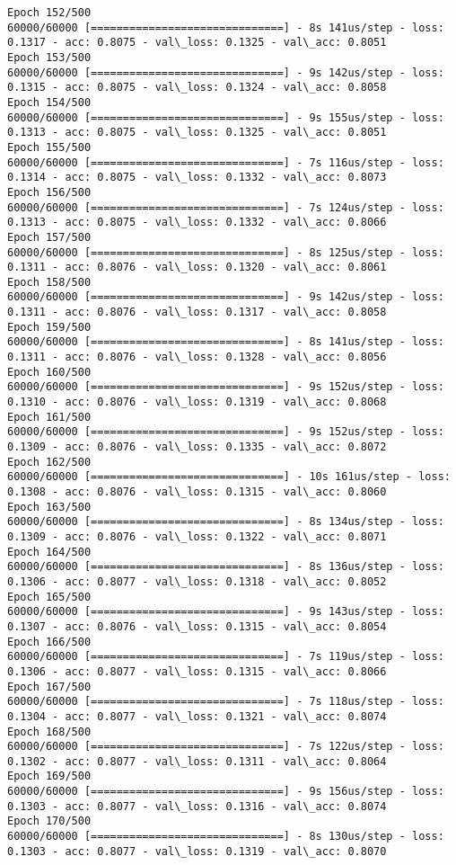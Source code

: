 \documentclass[11pt]{article}
\begin{document}
\begin{Verbatim}[commandchars=\\\{\}]
Epoch 152/500
60000/60000 [==============================] - 8s 141us/step - loss: 0.1317 - acc: 0.8075 - val\_loss: 0.1325 - val\_acc: 0.8051
Epoch 153/500
60000/60000 [==============================] - 9s 142us/step - loss: 0.1315 - acc: 0.8075 - val\_loss: 0.1324 - val\_acc: 0.8058
Epoch 154/500
60000/60000 [==============================] - 9s 155us/step - loss: 0.1313 - acc: 0.8075 - val\_loss: 0.1325 - val\_acc: 0.8051
Epoch 155/500
60000/60000 [==============================] - 7s 116us/step - loss: 0.1314 - acc: 0.8075 - val\_loss: 0.1332 - val\_acc: 0.8073
Epoch 156/500
60000/60000 [==============================] - 7s 124us/step - loss: 0.1313 - acc: 0.8075 - val\_loss: 0.1332 - val\_acc: 0.8066
Epoch 157/500
60000/60000 [==============================] - 8s 125us/step - loss: 0.1311 - acc: 0.8076 - val\_loss: 0.1320 - val\_acc: 0.8061
Epoch 158/500
60000/60000 [==============================] - 9s 142us/step - loss: 0.1311 - acc: 0.8076 - val\_loss: 0.1317 - val\_acc: 0.8058
Epoch 159/500
60000/60000 [==============================] - 8s 141us/step - loss: 0.1311 - acc: 0.8076 - val\_loss: 0.1328 - val\_acc: 0.8056
Epoch 160/500
60000/60000 [==============================] - 9s 152us/step - loss: 0.1310 - acc: 0.8076 - val\_loss: 0.1319 - val\_acc: 0.8068
Epoch 161/500
60000/60000 [==============================] - 9s 152us/step - loss: 0.1309 - acc: 0.8076 - val\_loss: 0.1335 - val\_acc: 0.8072
Epoch 162/500
60000/60000 [==============================] - 10s 161us/step - loss: 0.1308 - acc: 0.8076 - val\_loss: 0.1315 - val\_acc: 0.8060
Epoch 163/500
60000/60000 [==============================] - 8s 134us/step - loss: 0.1309 - acc: 0.8076 - val\_loss: 0.1322 - val\_acc: 0.8071
Epoch 164/500
60000/60000 [==============================] - 8s 136us/step - loss: 0.1306 - acc: 0.8077 - val\_loss: 0.1318 - val\_acc: 0.8052
Epoch 165/500
60000/60000 [==============================] - 9s 143us/step - loss: 0.1307 - acc: 0.8076 - val\_loss: 0.1315 - val\_acc: 0.8054
Epoch 166/500
60000/60000 [==============================] - 7s 119us/step - loss: 0.1306 - acc: 0.8077 - val\_loss: 0.1315 - val\_acc: 0.8066
Epoch 167/500
60000/60000 [==============================] - 7s 118us/step - loss: 0.1304 - acc: 0.8077 - val\_loss: 0.1321 - val\_acc: 0.8074
Epoch 168/500
60000/60000 [==============================] - 7s 122us/step - loss: 0.1302 - acc: 0.8077 - val\_loss: 0.1311 - val\_acc: 0.8064
Epoch 169/500
60000/60000 [==============================] - 9s 156us/step - loss: 0.1303 - acc: 0.8077 - val\_loss: 0.1316 - val\_acc: 0.8074
Epoch 170/500
60000/60000 [==============================] - 8s 130us/step - loss: 0.1303 - acc: 0.8077 - val\_loss: 0.1319 - val\_acc: 0.8070

\end{Verbatim}
\end{document}
